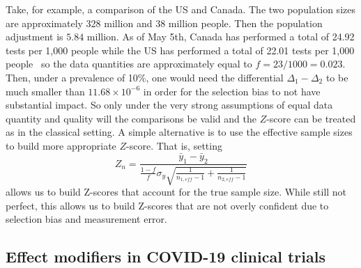\documentclass[12pt]{article}
\begin{document}
Take, for example, a comparison of the US and Canada.  The two population sizes are approximately 328 million and 38 million people.  Then the population adjustment is $5.84$ million. As of May 5th, Canada has performed a total of 24.92 tests per 1,000 people while the US has performed a total of 22.01 tests per 1,000 people~\cite{worlddata} so the data quantities are approximately equal to $f = 23/1000 = 0.023$.  Then, under a prevalence of 10\%, one would need the differential $\Delta_1-\Delta_2$ to be much smaller than $11.68 \times 10^{-6}$ in order for the selection bias to not have substantial impact.  So only under the very strong assumptions of equal data quantity and quality will the comparisons be valid and the $Z$-score can be treated as in the classical setting.  A simple alternative is to use the effective sample sizes to build more appropriate $Z$-score.  That is, setting
$$
Z_n = \frac{\bar y_1 - \bar y_2}{ \frac{1-f}{f} \sigma_y \sqrt{ \frac{1}{n_{1,eff} - 1} + \frac{1}{n_{2,eff} - 1}}}
$$
allows us to build Z-scores that account for the true sample size.  While still not perfect, this allows us to build Z-scores that are not overly confident due to selection bias and measurement error.

\subsection*{Effect modifiers in COVID-19 clinical trials}
\end{document}
